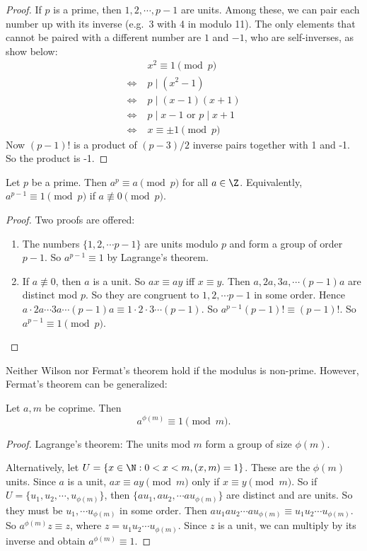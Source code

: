 \documentclass[a4paper]{article}
\begin{document}
\begin{proof}
  If $p$ is a prime, then $1, 2, \cdots, p - 1$ are units. Among these, we can pair each number up with its inverse (e.g.\ 3 with 4 in modulo 11). The only elements that cannot be paired with a different number are $1$ and $-1$, who are self-inverses, as show below:
  \begin{align*}
    &\;x^2 \equiv 1\pmod p\\
    \Leftrightarrow&\; p \mid (x^2 - 1)\\
    \Leftrightarrow&\; p \mid (x - 1)(x + 1)\\
    \Leftrightarrow&\; p \mid x - 1 \text{ or } p \mid x + 1\\
    \Leftrightarrow&\; x \equiv \pm 1\pmod p
  \end{align*}
  Now $(p - 1)!$ is a product of $(p - 3)/2$ inverse pairs together with 1 and -1. So the product is -1.
\end{proof}

\begin{thm}
  Let $p$ be a prime. Then $a^p \equiv a\pmod p$ for all $a\in \Z$. Equivalently, $a^{p - 1}\equiv 1\pmod p$ if $a\not\equiv 0 \pmod p$.
\end{thm}

\begin{proof}
  Two proofs are offered:
  \begin{enumerate}
    \item The numbers $\{1, 2, \cdots p - 1\}$ are units modulo $p$ and form a group of order $p - 1$. So $a^{p - 1} \equiv 1$ by Lagrange's theorem.
    \item If $a\not\equiv 0$, then $a$ is a unit. So $ax \equiv ay$ iff $x\equiv y$. Then $a, 2a, 3a, \cdots (p - 1)a$ are distinct mod $p$. So they are congruent to $1, 2, \cdots p -1$ in some order. Hence $a\cdot 2a\cdots 3a\cdots (p - 1)a\equiv 1\cdot 2\cdot 3 \cdots (p - 1)$. So $a^{p - 1}(p - 1)! \equiv (p - 1)!$. So $a^{p - 1} \equiv 1\pmod p$.
  \end{enumerate}
\end{proof}
Neither Wilson nor Fermat's theorem hold if the modulus is non-prime. However, Fermat's theorem can be generalized:
\begin{thm}
  Let $a, m$ be coprime. Then
  \[
    a^{\phi(m)} \equiv 1\pmod m.
  \]
\end{thm}

\begin{proof}
  Lagrange's theorem: The units mod $m$ form a group of size $\phi(m)$.

  Alternatively, let $U = \{x\in \N: 0 < x < m, (x, m) = 1\}$. These are the $\phi(m)$ units. Since $a$ is a unit, $ax\equiv ay \pmod m$ only if $x\equiv y\pmod m$. So if $U = \{u_1, u_2, \cdots , u_{\phi(m)}\}$, then $\{au_1, au_2, \cdots au_{\phi(m)}\}$ are distinct and are units. So they must be $u_1, \cdots u_{\phi(m)}$ in some order. Then $au_1au_2\cdots au_{\phi(m)} \equiv u_1u_2\cdots u_{\phi(m)}$. So $a^{\phi(m)}z \equiv z$, where $z = u_1u_2\cdots u_{\phi(m)}$. Since $z$ is a unit, we can multiply by its inverse and obtain $a^{\phi(m)} \equiv 1$.
\end{proof}
\end{document}
